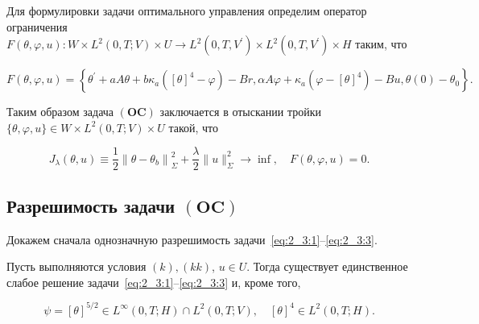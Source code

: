 Для формулировки задачи оптимального управления определим оператор ограничения
$F(\theta, \varphi, u): W \times L^{2}(0, T; V) \times U
\rightarrow L^{2} \left(0, T, V^{\prime}\right)
\times L^{2}\left(0, T, V^{\prime}\right) \times H$ таким, что

\[
    F(\theta, \varphi, u)=\left\{\theta^{\prime}+a A
    \theta+b \kappa_{a}\left([\theta]^{4}-\varphi\right)-B r,
    \alpha A \varphi+\kappa_{a}\left(\varphi-[\theta]^{4}\right)-B u,
    \theta(0)-\theta_{0}\right\}.
\]

Таким образом задача $(\mathbf{OC})$ заключается в отыскании тройки
$\{\theta, \varphi, u\} \in W \times L^{2}(0, T ; V) \times U$ такой, что

\[
    J_{\lambda}(\theta, u) \equiv \frac{1}{2}\left\|\theta-
    \theta_{b}\right\|_{\Sigma}^{2}+
    \frac{\lambda}{2}\|u\|_{\Sigma}^{2}
    \rightarrow \inf, \quad F(\theta, \varphi, u)=0.
\]

\subsection{Разрешимость задачи $(\mathbf{OC})$}
\label{subsec:ch2/sec3/subsec3}
Докажем сначала однозначную разрешимость
задачи~\eqref{eq:2_3:1}--\eqref{eq:2_3:3}.

\begin{lemma}
    \label{lm:2_3:1}
    Пусть выполняются условия $(k), (kk)$, $u \in U$.
    Тогда существует единственное слабое решение
    задачи~\eqref{eq:2_3:1}--\eqref{eq:2_3:3} и, кроме того,

    \[
        \psi=[\theta]^{5 / 2} \in L^{\infty}(0, T; H) \cap L^{2}(0, T ; V),
        \quad[\theta]^{4} \in L^{2}(0, T ; H).
    \]
\end{lemma}

